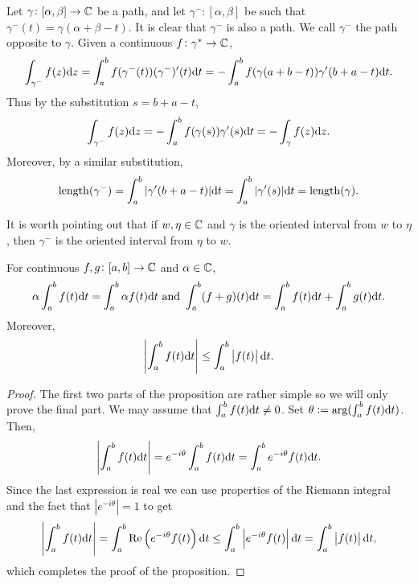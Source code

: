 \documentclass[11pt,a4paper]{article}
\begin{document}
\begin{example}
  Let $\gamma \colon [\alpha, \beta] \to \mathbb{C}$ be a path, and let
  $\gamma^- \colon [\alpha, \beta]$ be such that
  $\gamma^-(t) = \gamma(\alpha + \beta - t)$.
  It is clear that $\gamma^-$ is also a path.
  We call $\gamma^-$ the path opposite to $\gamma$.
  Given a continuous $f \colon \gamma^* \to \mathbb{C}$,
  \[
    \int_{\gamma^-} f(z) \mathrm{d} z =
    \int_{a}^{b} f(\gamma^-(t))(\gamma^-)'(t) \mathrm{d} t =
    - 
    \int_{a}^{b} f(\gamma(a + b - t))\gamma'(b + a - t) \mathrm{d} t.
  \]
  Thus by the substitution $s = b + a - t$,
  \[
    \int_{\gamma^-} f(z) \mathrm{d} z =
    - \int_{a}^{b} f(\gamma(s))\gamma'(s) \mathrm{d} t =
    - \int_{\gamma} f(z) \mathrm{d} z.
  \]
  Moreover, by a similar substitution,
  \[
    \mathrm{length}(\gamma^-) =
    \int_{a}^{b} |\gamma'(b + a - t)| \mathrm{d} t =
    \int_{a}^{b} |\gamma'(s)| \mathrm{d} t = \mathrm{length}(\gamma).
  \]
\end{example}
\begin{remark}
  It is worth pointing out that if $w, \eta \in \mathbb{C}$ and 
  $\gamma$ is the oriented interval from $w$ to $\eta$,
  then $\gamma^-$ is the oriented interval from $\eta$ to $w$.
\end{remark}

\begin{proposition}
  For continuous $f,g \colon [a,b] \to \mathbb{C}$ and $\alpha \in \mathbb{C}$,
  \[
    \alpha \int_{a}^{b} f(t) \mathrm{d} t =
    \int_{a}^{b} \alpha f(t) \mathrm{d} t \text{ and }
    \int_{a}^{b} (f + g)(t) \mathrm{d} t =
    \int_{a}^{b} f(t) \mathrm{d} t +
    \int_{a}^{b} g(t) \mathrm{d} t.
  \]
  Moreover,
  \[
    \left\lvert\int_{a}^{b} f(t) \mathrm{d} t\right\rvert \le
    \int_{a}^{b} \left\lvert f(t)\right\rvert \mathrm{d} t.
  \]
\end{proposition}
\begin{proof}
  The first two parts of the proposition are rather simple so we will only
  prove the final part.
  We may assume that $\int_a^b f(t) \mathrm{d} t \neq 0$.
  Set $\theta := \arg(\int_a^b f(t) \mathrm{d} t)$. Then,
  \[
    \left\lvert\int_{a}^{b} f(t) \mathrm{d} t\right\rvert =
    e^{- i \theta} \int_{a}^{b} f(t) \mathrm{d} t =
    \int_{a}^{b} e^{- i \theta} f(t) \mathrm{d} t.
  \]
  Since the last expression is real we can use properties of the Riemann
  integral and the fact that $|e^{- i \theta}| = 1$ to get
  \[
    \abs{\int_{a}^{b} f(t) \dt} =
    \int_{a}^{b} \Re\del{e^{- i \theta} f(t)} \dt \le
    \int_{a}^{b} \abs{e^{- i \theta} f(t)} \dt =
    \int_{a}^{b} \abs{f(t)} \dt,
  \]
  which completes the proof of the proposition.
\end{proof}
\end{document}
